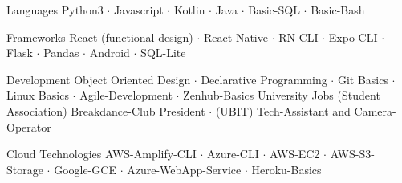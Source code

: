 

\begin{cvskills}

  \cvskill
    {Languages} %
    {Python3 $\cdot$ Javascript $\cdot$ Kotlin $\cdot$ Java $\cdot$ Basic-SQL $\cdot$ Basic-Bash } %

  \cvskill
    {Frameworks} %
    {React (functional design) $\cdot$ React-Native $\cdot$ RN-CLI $\cdot$ Expo-CLI $\cdot$ Flask $\cdot$ Pandas $\cdot$ Android $\cdot$ SQL-Lite} %

  \cvskill
    {Development} %
    {Object Oriented Design $\cdot$ Declarative Programming $\cdot$ Git Basics $\cdot$ Linux Basics $\cdot$ Agile-Development $\cdot$ Zenhub-Basics} %
  \cvskill
  {University Jobs} %
  {(Student Association) Breakdance-Club President $\cdot$  (UBIT) Tech-Assistant and Camera-Operator }

  \cvskill
  {Cloud Technologies} %
  {AWS-Amplify-CLI $\cdot$ Azure-CLI $\cdot$ AWS-EC2 $\cdot$ AWS-S3-Storage $\cdot$ Google-GCE $\cdot$ Azure-WebApp-Service $\cdot$ Heroku-Basics} %


\end{cvskills}